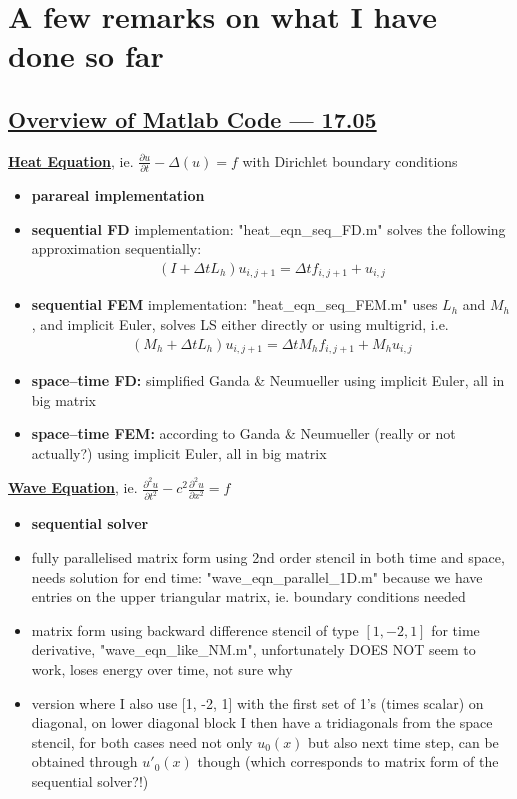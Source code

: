 \documentclass[a4paper, 11pt]{article}
\begin{document}
\section*{A few remarks on what I have done so far}

\subsection*{\underline{Overview of Matlab Code --- 17.05}} 

\underline{\textbf{Heat Equation}}, ie. $ \frac{\partial u}{\partial t} - \Delta(u) = f$ with Dirichlet boundary conditions

\begin{itemize}
	\item \textbf{parareal implementation}
	\item \textbf{sequential FD} implementation: "heat\_eqn\_seq\_FD.m" solves the following approximation sequentially:
	\begin{align*}
	(I + \Delta t L_h) u_{i,j+1} = \Delta t f_{i,j+1} + u_{i,j} 
	\end{align*}
	\item \textbf{sequential FEM} implementation: "heat\_eqn\_seq\_FEM.m" uses $L_h$ and $M_h$, and implicit Euler, solves LS either directly or using multigrid, i.e.
	\begin{align*}
	(M_h + \Delta t L_h) u_{i,j+1} = \Delta t M_h f_{i,j+1} + M_h u_{i,j} 
	\end{align*}
	\item \textbf{space--time FD:} simplified Ganda \& Neumueller using implicit Euler, all in big matrix
	\item \textbf{space--time FEM:} according to Ganda \& Neumueller (really or not actually?) using implicit Euler, all in big matrix

\end{itemize}
	
\underline{\textbf{Wave Equation}}, ie. $\frac{\partial^2 u}{\partial t^2} - c^2 \frac{\partial^2 u}{\partial x^2}  = f$
\begin{itemize}
	\item \textbf{sequential solver} 
	\item fully parallelised matrix form using 2nd order stencil in both time and space, needs solution for end time: "wave\_eqn\_parallel\_1D.m" because we have entries on the upper triangular matrix, ie. boundary conditions needed
	\item matrix form using backward difference stencil of type $[1, -2, 1]$ for time derivative, "wave\_eqn\_like\_NM.m", unfortunately DOES NOT seem to work, loses energy over time, not sure why
	\item version where I also use [1, -2, 1] with the first set of 1's (times scalar) on diagonal, on lower diagonal block I then have a tridiagonals from the space stencil, for both cases need not only $u_0(x)$ but also next time step, can be obtained through $u'_0(x)$ though (which corresponds to matrix form of the sequential solver?!)
\end{itemize}
\end{document}
